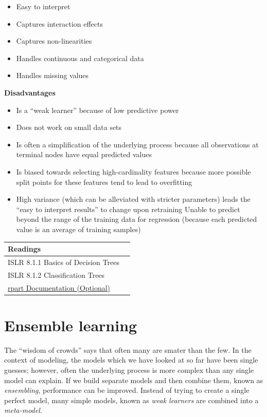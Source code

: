 \documentclass[
  openany]{book}
\providecommand{\tightlist}{%
  \setlength{\itemsep}{0pt}\setlength{\parskip}{0pt}}
\begin{document}
\begin{itemize}
\tightlist
\item
  Easy to interpret
\item
  Captures interaction effects
\item
  Captures non-linearities
\item
  Handles continuous and categorical data
\item
  Handles missing values
\end{itemize}

\textbf{Disadvantages}

\begin{itemize}
\tightlist
\item
  Is a ``weak learner'' because of low predictive power
\item
  Does not work on small data sets
\item
  Is often a simplification of the underlying process because all observations at terminal nodes have equal predicted values
\item
  Is biased towards selecting high-cardinality features because more possible split points for these features tend to lead to overfitting
\item
  High variance (which can be alleviated with stricter parameters) leads the ``easy to interpret results'' to change upon retraining
  Unable to predict beyond the range of the training data for regression (because each predicted value is an average of training samples)
\end{itemize}

\begin{longtable}[]{@{}ll@{}}
\toprule
Readings &\tabularnewline
\midrule
\endhead
ISLR 8.1.1 Basics of Decision Trees &\tabularnewline
ISLR 8.1.2 Classification Trees &\tabularnewline
\href{https://cran.r-project.org/web/packages/rpart/vignettes/longintro.pdf}{rpart Documentation (Optional)} &\tabularnewline
\bottomrule
\end{longtable}

\hypertarget{ensemble-learning}{%
\section{Ensemble learning}\label{ensemble-learning}}

The ``wisdom of crowds'' says that often many are smater than the few. In the context of modeling, the models which we have looked at so far have been single guesses; however, often the underlying process is more complex than any single model can explain. If we build separate models and then combine them, known as \emph{ensembling}, performance can be improved. Instead of trying to create a single perfect model, many simple models, known as \emph{weak learners} are combined into a \emph{meta-model}.
\end{document}
